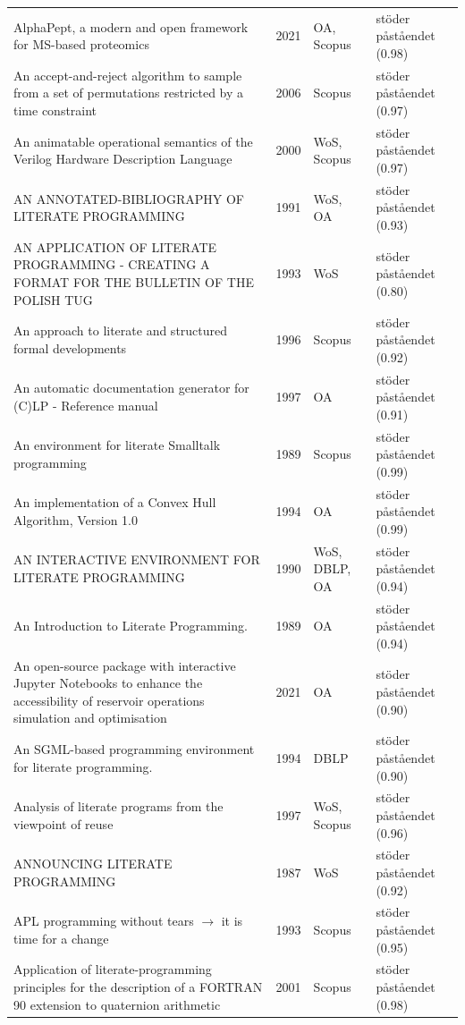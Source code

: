 \begin{longtable}{@{}%
  >{\raggedright\arraybackslash}p{}c%
  >{\raggedright\arraybackslash}p{}%
  >{\raggedright\arraybackslash}p{}@{}}
AlphaPept, a modern and open framework for MS-based proteomics & 2021 & OA, Scopus & stöder påståendet (0.98) \\
An accept-and-reject algorithm to sample from a set of permutations restricted by a time constraint & 2006 & Scopus & stöder påståendet (0.97) \\
An animatable operational semantics of the Verilog Hardware Description Language & 2000 & WoS, Scopus & stöder påståendet (0.97) \\
AN ANNOTATED-BIBLIOGRAPHY OF LITERATE PROGRAMMING & 1991 & WoS, OA & stöder påståendet (0.93) \\
AN APPLICATION OF LITERATE PROGRAMMING - CREATING A FORMAT FOR THE BULLETIN OF THE POLISH TUG & 1993 & WoS & stöder påståendet (0.80) \\
An approach to literate and structured formal developments & 1996 & Scopus & stöder påståendet (0.92) \\
An automatic documentation generator for (C)LP - Reference manual & 1997 & OA & stöder påståendet (0.91) \\
An environment for literate Smalltalk programming & 1989 & Scopus & stöder påståendet (0.99) \\
An implementation of a Convex Hull Algorithm, Version 1.0 & 1994 & OA & stöder påståendet (0.99) \\
AN INTERACTIVE ENVIRONMENT FOR LITERATE PROGRAMMING & 1990 & WoS, DBLP, OA & stöder påståendet (0.94) \\
An Introduction to Literate Programming. & 1989 & OA & stöder påståendet (0.94) \\
An open-source package with interactive Jupyter Notebooks to enhance the accessibility of reservoir operations simulation and optimisation & 2021 & OA & stöder påståendet (0.90) \\
An SGML-based programming environment for literate programming. & 1994 & DBLP & stöder påståendet (0.90) \\
Analysis of literate programs from the viewpoint of reuse & 1997 & WoS, Scopus & stöder påståendet (0.96) \\
ANNOUNCING LITERATE PROGRAMMING & 1987 & WoS & stöder påståendet (0.92) \\
APL programming without tears \ensuremath{\rightarrow} it is time for a change & 1993 & Scopus & stöder påståendet (0.95) \\
Application of literate-programming principles for the description of a FORTRAN 90 extension to quaternion arithmetic & 2001 & Scopus & stöder påståendet (0.98) \\

\end{longtable}

